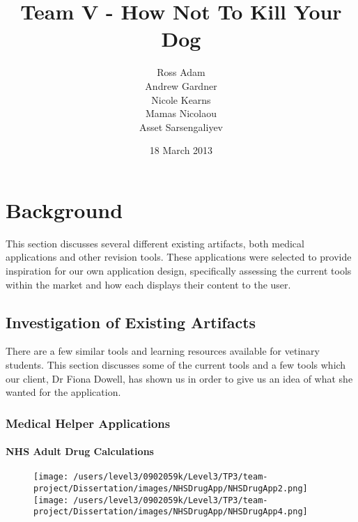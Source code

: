 \documentclass{l3proj}
\begin{document}
\title{Team V - How Not To Kill Your Dog}
\author{Ross Adam \\
        Andrew Gardner \\
        Nicole Kearns \\
        Mamas Nicolaou \\
        Asset Sarsengaliyev}
\date{18 March 2013}
\maketitle

\tableofcontents

\chapter{Background}
\label{background}

This section discusses several different existing artifacts, both medical applications and other revision tools. These applications were selected to provide inspiration for our own application design, specifically assessing the current tools within the market and how each displays their content to the user.

\section{Investigation of Existing Artifacts}


There are a few similar tools and learning resources available for vetinary students. This section discusses some of the current tools and a few tools which our client, Dr Fiona Dowell, has shown us in order to give us an idea of what she wanted for the application.

\subsection{Medical Helper Applications}


\subsubsection{NHS Adult Drug Calculations}

\begin{figure}[!htb]
  \texttt{[image: /users/level3/0902059k/Level3/TP3/team-project/Dissertation/images/NHSDrugApp/NHSDrugApp2.png]}
\endminipage\hfill
{}
  \texttt{[image: /users/level3/0902059k/Level3/TP3/team-project/Dissertation/images/NHSDrugApp/NHSDrugApp4.png]}
\endminipage
\end{figure}
\end{document}

